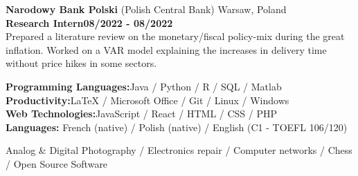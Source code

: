 \documentclass[11pt]{report}
\begin{document}
\noindent\textbf{Narodowy Bank Polski} (Polish Central Bank) \hfill Warsaw, Poland\\[0.1cm]
\textbf{Research Intern}\hfill \textbf{08/2022  - 08/2022} \\
Prepared a literature review on the monetary/fiscal policy-mix during the great inflation. Worked on a VAR model explaining the increases in delivery time without price hikes in some sectors. 


	\begin{flushleft}
	 \hrulefill
	\end{flushleft}



  \noindent\textbf{Programming Languages:}\hfill{Java / Python / R / SQL / Matlab} \\
  \textbf{Productivity:}\hfill LaTeX / Microsoft Office / Git / Linux / Windows\\
  \textbf{Web Technologies:}\hfill JavaScript / React / HTML / CSS / PHP  \\
  \textbf{Languages:} \hfill French (native) / Polish (native) / English (C1 - TOEFL 106/120) 

	\begin{flushleft}
	 \hrulefill
	\end{flushleft}

\noindent Analog \& Digital Photography / Electronics repair / Computer networks  / Chess / Open Source Software
\end{document}

